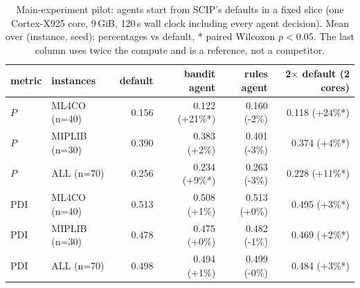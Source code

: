 \begin{table}[t]\centering\small
\begin{tabular}{llrrrr}
\toprule
metric & instances & default & bandit agent & rules agent & 2$\times$ default (2 cores) \\
\midrule
$P$ & ML4CO (n=40) & 0.156 & 0.122 (+21\%*) & 0.160 (-2\%) & 0.118 (+24\%*) \\
$P$ & MIPLIB (n=30) & 0.390 & 0.383 (+2\%) & 0.401 (-3\%) & 0.374 (+4\%*) \\
$P$ & ALL (n=70) & 0.256 & 0.234 (+9\%*) & 0.263 (-3\%) & 0.228 (+11\%*) \\
PDI & ML4CO (n=40) & 0.513 & 0.508 (+1\%) & 0.513 (+0\%) & 0.495 (+3\%*) \\
PDI & MIPLIB (n=30) & 0.478 & 0.475 (+0\%) & 0.482 (-1\%) & 0.469 (+2\%*) \\
PDI & ALL (n=70) & 0.498 & 0.494 (+1\%) & 0.499 (-0\%) & 0.484 (+3\%*) \\
\bottomrule
\end{tabular}
\caption{Main-experiment pilot: agents start from SCIP's defaults in a fixed slice (one Cortex-X925 core, 9\,GiB, 120\,s wall clock including every agent decision). Mean over (instance, seed); percentages vs default, * paired Wilcoxon $p<0.05$. The last column uses twice the compute and is a reference, not a competitor.}\label{tab:pilot}
\end{table}